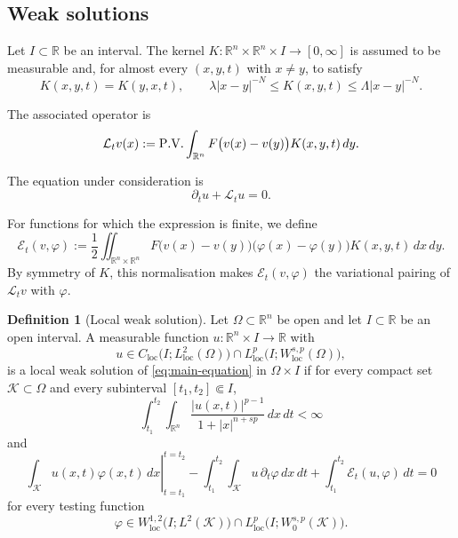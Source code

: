 \documentclass[10pt]{amsart}
\theoremstyle{plain}
\theoremstyle{definition}
\newtheorem{definition}[lemma]{Definition}
\theoremstyle{remark}
\numberwithin{equation}{section}
\newcommand{\R}{\mathbb R}
\begin{document}
\subsection{Weak solutions}

Let $I\subset\R$ be an interval. The kernel
$K:\R^n\times\R^n\times I\to[0,\infty]$ is assumed to be measurable and,
for almost every $(x,y,t)$ with $x\ne y$, to satisfy
\begin{equation}\label{eq:kernel}
K(x,y,t)=K(y,x,t),
\qquad
\lambda |x-y|^{-N}
\le K(x,y,t)
\le \Lambda |x-y|^{-N}.
\end{equation}

The associated operator is
\begin{equation}\label{eq:operator}
\mathcal L_t v(x)
:={\rm P.V.}\int_{\mathbb R^n}
F\bigl(v(x)-v(y)\bigr)K(x,y,t)\,dy.
\end{equation}

The equation under consideration is
\begin{equation}\label{eq:main-equation}
\partial_tu+\mathcal L_tu=0.
\end{equation}

For functions for which the expression is finite, we define
\begin{equation}\label{eq:energy}
\mathcal{E}_t(v,\varphi)
:=
\frac12
\iint_{\R^n\times\R^n}
F\bigl(v(x)-v(y)\bigr)
\bigl(\varphi(x)-\varphi(y)\bigr)
K(x,y,t)\,dx\,dy.
\end{equation}
By symmetry of $K$, this normalisation makes $\mathcal E_t(v,\varphi)$
the variational pairing of $\mathcal L_t v$ with $\varphi$.

\begin{definition}[Local weak solution]\label{def:weak}
Let $\Omega\subset\R^n$ be open and let $I\subset\R$ be an open interval.
A measurable function $u:\R^n\times I\to\R$ with
\begin{equation}\label{eq:weak-regularity}
u\in
C_{\mathrm{loc}}\bigl(I;L^2_{\mathrm{loc}}(\Omega)\bigr)
\cap
L^p_{\mathrm{loc}}
\bigl(I;W^{s,p}_{\mathrm{loc}}(\Omega)\bigr),
\end{equation}
is a local weak solution of \eqref{eq:main-equation} in $\Omega\times I$ if 
for every compact set $\mathcal K\subset\Omega$ and every subinterval
$[t_1,t_2]\Subset I$,
\begin{equation}\label{eq:weak-tail-condition}
\int_{t_1}^{t_2}\int_{\R^n}
\frac{|u(x,t)|^{p-1}}{1+|x|^{n+sp}}\,dx\,dt
<\infty
\end{equation}
and
\begin{equation}\label{eq:weak-form}
\left.
\int_{\mathcal K}u(x,t)\varphi(x,t)\,dx
\right|_{t=t_1}^{t=t_2}
-
\int_{t_1}^{t_2}\int_{\mathcal K}
u\,\partial_t\varphi\,dx\,dt
+
\int_{t_1}^{t_2}\mathcal{E}_t(u,\varphi)\,dt
=0
\end{equation}
for every testing function
\begin{equation}\label{eq:weak-test-space}
\varphi\in
W^{1,2}_{\mathrm{loc}}\bigl(I;L^2(\mathcal K)\bigr)
\cap
L^p_{\mathrm{loc}}\bigl(I;W^{s,p}_0(\mathcal K)\bigr).
\end{equation}
\end{definition}
\end{document}
